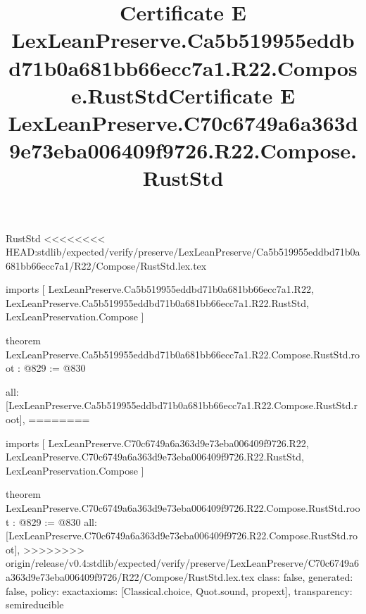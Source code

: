\begin{lexlean}{RustStd}
<<<<<<<< HEAD:stdlib/expected/verify/preserve/LexLeanPreserve/Ca5b519955eddbd71b0a681bb66ecc7a1/R22/Compose/RustStd.lex.tex
\title{Certificate E LexLeanPreserve.Ca5b519955eddbd71b0a681bb66ecc7a1.R22.Compose.RustStd}
\begin{coremodule}
imports [
  LexLeanPreserve.Ca5b519955eddbd71b0a681bb66ecc7a1.R22,
  LexLeanPreserve.Ca5b519955eddbd71b0a681bb66ecc7a1.R22.RustStd,
  LexLeanPreservation.Compose
]

theorem LexLeanPreserve.Ca5b519955eddbd71b0a681bb66ecc7a1.R22.Compose.RustStd.root : @829 := @830 {
  all: [LexLeanPreserve.Ca5b519955eddbd71b0a681bb66ecc7a1.R22.Compose.RustStd.root],
========
\title{Certificate E LexLeanPreserve.C70c6749a6a363d9e73eba006409f9726.R22.Compose.RustStd}
\begin{coremodule}
imports [
  LexLeanPreserve.C70c6749a6a363d9e73eba006409f9726.R22,
  LexLeanPreserve.C70c6749a6a363d9e73eba006409f9726.R22.RustStd,
  LexLeanPreservation.Compose
]

theorem LexLeanPreserve.C70c6749a6a363d9e73eba006409f9726.R22.Compose.RustStd.root : @829 := @830 {
  all: [LexLeanPreserve.C70c6749a6a363d9e73eba006409f9726.R22.Compose.RustStd.root],
>>>>>>>> origin/release/v0.4:stdlib/expected/verify/preserve/LexLeanPreserve/C70c6749a6a363d9e73eba006409f9726/R22/Compose/RustStd.lex.tex
  class: false,
  generated: false,
  policy: exact{axioms: [Classical.choice, Quot.sound, propext]},
  transparency: semireducible
}


\end{coremodule}}
\end{coremodule}
\end{lexlean}
